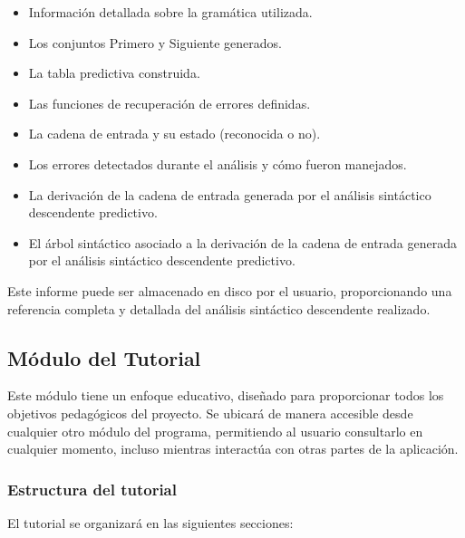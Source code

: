 \begin{itemize}
  \item Información detallada sobre la gramática utilizada.
  \item Los conjuntos Primero y Siguiente generados.
  \item La tabla predictiva construida.
  \item Las funciones de recuperación de errores definidas.
  \item La cadena de entrada y su estado (reconocida o no).
  \item Los errores detectados durante el análisis y cómo fueron manejados.
  \item La derivación de la cadena de entrada generada por el análisis sintáctico descendente predictivo.
  \item El árbol sintáctico asociado a la derivación de la cadena de entrada generada por el análisis sintáctico descendente predictivo.
\end{itemize}

Este informe puede ser almacenado en disco por el usuario, proporcionando una referencia completa y detallada del análisis sintáctico descendente realizado.


\subsection{Módulo del Tutorial}

Este módulo tiene un enfoque educativo, diseñado para proporcionar todos los objetivos pedagógicos del proyecto. Se ubicará de manera accesible desde cualquier otro módulo del programa, permitiendo al usuario consultarlo en cualquier momento, incluso mientras interactúa con otras partes de la aplicación.

\subsubsection{Estructura del tutorial}

El tutorial se organizará en las siguientes secciones:


